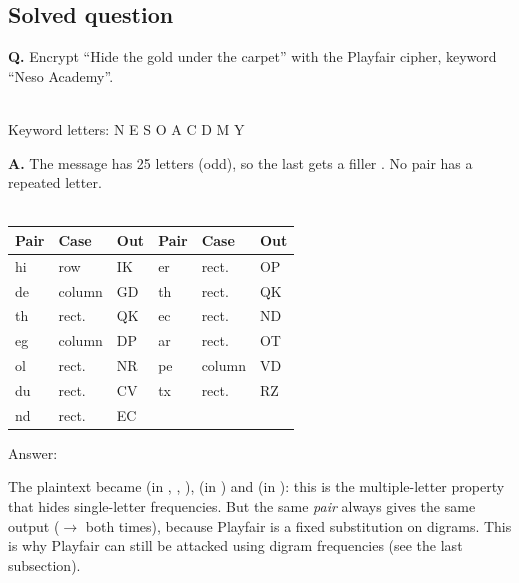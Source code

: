\subsection{Solved question}
\begin{worked}
\textbf{Q.} Encrypt ``Hide the gold under the carpet'' with the Playfair cipher, keyword ``Neso Academy''.

\begin{minipage}[c]{0.36\textwidth}
\centering
{}\\[2pt]
{\footnotesize Keyword letters: N E S O A C D M Y}
\end{minipage}\hfill
\begin{minipage}[c]{0.6\textwidth}
\textbf{A.} The message has 25 letters (odd), so the last  gets a filler . No pair has a repeated letter.\\[3pt]
\\[3pt]
\small
\begin{tabular}{@{}lll|lll@{}}
\toprule
Pair & Case & Out & Pair & Case & Out\\
\midrule
hi & row & IK & er & rect. & OP\\
de & column & GD & th & rect. & QK\\
th & rect. & QK & ec & rect. & ND\\
eg & column & DP & ar & rect. & OT\\
ol & rect. & NR & pe & column & VD\\
du & rect. & CV & tx & rect. & RZ\\
nd & rect. & EC & & &\\
\bottomrule
\end{tabular}
\end{minipage}

\medskip
Answer: \textbf{}
\end{worked}
The plaintext  became  (in , , ),  (in ) and  (in ): this is the multiple-letter property that hides single-letter frequencies. But the same \emph{pair} always gives the same output ($\to$ both times), because Playfair is a fixed substitution on digrams. This is why Playfair can still be attacked using digram frequencies (see the last subsection).

